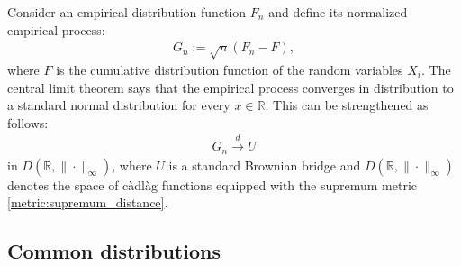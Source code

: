     \begin{theorem}[Donsker]
        Consider an empirical distribution function $F_n$ and define its normalized empirical process:
        \begin{gather}
            G_n := \sqrt{n}(F_n-F),
        \end{gather}
        where $F$ is the cumulative distribution function of the random variables $X_i$. The central limit theorem says that the empirical process converges in distribution to a standard normal distribution for every $x\in\mathbb{R}$. This can be strengthened as follows:
        \begin{gather}
            G_n\overset{d}{\longrightarrow}U
        \end{gather}
        in $D(\mathbb{R},\|\cdot\|_\infty)$, where $U$ is a standard Brownian bridge and $D(\mathbb{R},\|\cdot\|_\infty)$ denotes the space of c\`adl\`ag functions equipped with the supremum metric \ref{metric:supremum_distance}.
    \end{theorem}

\subsection{Common distributions}


